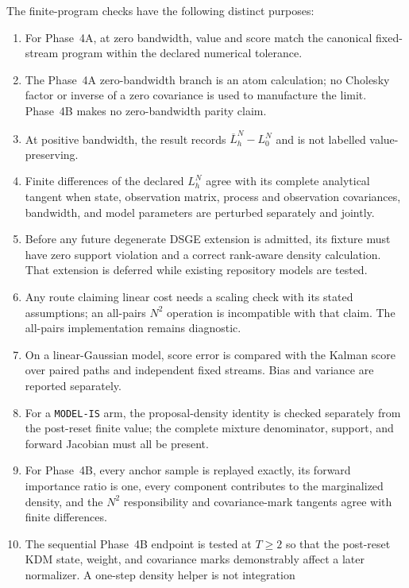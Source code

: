 \documentclass[11pt]{article}
\begin{document}
The finite-program checks have the following distinct purposes:
\begin{enumerate}[leftmargin=2em]
  \item For Phase~4A, at zero bandwidth, value and score match the canonical
        fixed-stream program within the declared numerical tolerance.
  \item The Phase~4A zero-bandwidth branch is an atom calculation; no Cholesky
        factor or inverse of a zero covariance is used to manufacture the
        limit.  Phase~4B makes no zero-bandwidth parity claim.
  \item At positive bandwidth, the result records
        $\overline L_h^N-L_0^N$ and is not labelled value-preserving.
  \item Finite differences of the declared $L_h^N$ agree with its complete
        analytical tangent when state, observation matrix, process and
        observation covariances, bandwidth, and model parameters are
        perturbed separately and jointly.
  \item Before any future degenerate DSGE extension is admitted, its fixture
        must have zero support violation and a correct rank-aware density
        calculation.  That extension is deferred while existing repository
        models are tested.
  \item Any route claiming linear cost needs a scaling check with its stated
        assumptions; an all-pairs $N^2$ operation is incompatible with that
        claim.  The all-pairs implementation remains diagnostic.
  \item On a linear-Gaussian model, score error is compared with the Kalman
        score over paired paths and independent fixed streams.  Bias and
        variance are reported separately.
  \item For a \texttt{MODEL-IS} arm, the proposal-density identity is checked
        separately from the post-reset finite value; the complete mixture
        denominator, support, and forward Jacobian must all be present.
  \item For Phase~4B, every anchor sample is replayed exactly, its forward
        importance ratio is one, every component contributes to the
        marginalized density, and the $N^2$ responsibility and covariance-mark
        tangents agree with finite differences.
  \item The sequential Phase~4B endpoint is tested at $T\ge2$ so that the
        post-reset KDM state, weight, and covariance marks demonstrably affect
        a later normalizer.  A one-step density helper is not integration

\end{enumerate}
\end{document}
